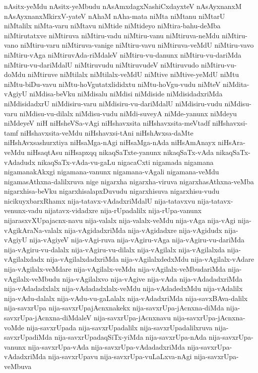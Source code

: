 {nAsitx-yeMdu
nAsitx-yeMbudu
nAsAmxdagxNashiCxdayxteV
nAsAyxnanxM
nAsAyxnanxMkirxV-yateV
nAhaM
nAha-mata
niMta
niMtanu
niMtarU
niMtalilx
niMta-varu
niMtavu
niMtide
niMtideyo
niMtira-bahu-deMba
niMtirutatxve
niMtiruva
niMtiru-vadu
niMtiru-vanu
niMtiruva-neMdu
niMtiru-vano
niMtiru-varu
niMtiruva-vanige
niMtiru-vavu
niMtiruva-veMdU
niMtiru-vavo
niMtiru-vAga
niMtiruvAda-riMdaleV
niMtiru-vu-danunx
niMtiru-vu-dariMda
niMtiru-vu-dariMdalU
niMtiruvudu
niMtiruvudeV
niMtiruvudo
niMtiru-vu-doMdu
niMtiruve
niMtilalx
niMtilalx-veMdU
niMtive
niMtive-yeMdU
niMtu
niMtu-biDu-vavu
niMtu-hoVgutatxlididxtu
niMtu-hoVgu-vudu
niMteV
niMdita-vAgiyU
niMdisa-beVku
niMdisalu
niMdisi
niMdiside
niMdisidadxriMda
niMdisidadxrU
niMdisiru-varu
niMdisiru-vu-dariMdalU
niMdisiru-vudu
niMdisu-varu
niMdisu-vu-dilalx
niMdisu-vudu
niMdi-suveyA
niMde-yanunx
niMdeyu
niMdeyeV
niH
niHsheVSa-vAgi
niHshavxsita
niHshavxsita-meVtadf
niHshavxsi-tamf
niHshavxsita-veMdu
niHshavxsi-tAni
niHshAvxsa-daMte
niHshAvxsashurxtiya
niHsaMga-nAgi
niHsaMga-nAda
niHsAmAnayx
niHsAra-veMdu
niHsaqtAsu
niHsapxqq
nikaqSaTxte-yanunx
nikaqSaTx-vAda
nikaqSaTx-vAdadudx
nikaqSaTx-vAda-vu-gaLu
nigacaCxti
nigamada
nigamana
nigamanakAkxgi
nigamana-vanunx
nigamana-vAgali
nigamana-veMdu
nigamasAthxna-dalilxruva
nige
nigarxha
nigarxha-viruva
nigarxhasAthxna-veMba
nigarxhisa-beVku
nigarxhisalapxDuvudu
nigarxhisuva
nigarxhisu-vudu
nicikuyxbarxRhamx
nija-tatavx-vAdadxriMdalU
nija-tatavxvu
nija-tatavx-venunx-vadu
nijatavx-vidadxre
nija-rUpadalilx
nija-rUpa-vanunx
nijarasxvXUpajacnx-navu
nija-valalx
nija-valalx-veMdu
nija-vAga
nija-vAgi
nija-vAgikAraNa-valalx
nija-vAgidadxriMda
nija-vAgidadxre
nija-vAgidudx
nija-vAgiyU
nija-vAgiyeV
nija-vAgi-ruva
nija-vAgiru-vAga
nija-vAgiru-vu-dariMda
nija-vAgiru-vu-dalalx
nija-vAgiru-vu-dilalx
nija-vAgilalx
nija-vAgilalxda
nija-vAgilalxdadx
nija-vAgilalxdadxriMda
nija-vAgilalxdedxMdu
nija-vAgilalx-vAdare
nija-vAgilalx-veMdare
nija-vAgilalx-veMdu
nija-vAgilalx-veMbudariMda
nija-vAgilalx-veMbudu
nija-vAgilalxvo
nija-vAgive
nija-vAda
nija-vAdadadxriMda
nija-vAdadadxlalx
nija-vAdadadxlalx-veMdu
nija-vAdadedxMdu
nija-vAdalilx
nija-vAdu-dalalx
nija-vAdu-vu-gaLalalx
nija-vAdadxriMda
nija-savxBAva-dalilx
nija-savxrUpa
nija-savxrUpajAcnxnakekx
nija-savxrUpa-jAcnxna-diMda
nija-savxrUpa-jAcnxna-diMdaleV
nija-savxrUpa-jAcnxnavu
nija-savxrUpa-jAcnxna-voMde
nija-savxrUpada
nija-savxrUpadalilx
nija-savxrUpadalilxruva
nija-savxrUpadiMda
nija-savxrUpadaqSiTx-yiMda
nija-savxrUpa-nAda
nija-savxrUpa-vanunx
nija-savxrUpa-vAda
nija-savxrUpa-vAdadadxriMda
nija-savxrUpa-vAdadxriMda
nija-savxrUpavu
nija-savxrUpa-vuLaLxva-nAgi
nija-savxrUpa-veMbuva
}
